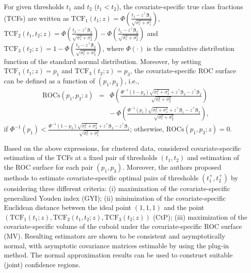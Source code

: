 For given thresholds $t_1$ and $t_2$ ($t_1 < t_2$), the covariate-specific true class fractions (TCFs) are written as $\mathrm{TCF}_1(t_1;z) = \Phi\left(\frac{t_1 - z^\top \boldsymbol{\beta}_1}{\sqrt{\sigma^2_c + \sigma^2_1}}\right)$, $\mathrm{TCF}_2(t_1, t_2;z) = \Phi\left(\frac{t_2 - z^\top \boldsymbol{\beta}_2}{\sqrt{\sigma^2_c + \sigma^2_2}}\right) - \Phi\left(\frac{t_1 - z^\top \boldsymbol{\beta}_2}{\sqrt{\sigma^2_c + \sigma^2_2}}\right)$ and $\mathrm{TCF}_3(t_2;z) = 1 - \Phi\left(\frac{t_2 - z^\top \boldsymbol{\beta}_3}{\sqrt{\sigma^2_c + \sigma^2_3}}\right)$, where $\Phi(\cdot)$ is the cumulative distribution function of the standard normal distribution. Moreover, by setting $\mathrm{TCF}_1(t_1;z) = p_1$ and $\mathrm{TCF}_3(t_2;z) = p_3$, the covariate-specific ROC surface can be defined as a function of $(p_1, p_3)$, i.e., 
\begin{eqnarray}
\mathrm{ROCs}(p_1, p_3; z) &=& \Phi\left(\frac{\Phi^{-1}(1 - p_3)\sqrt{\sigma^2_c + \sigma^2_3} + z^\top \boldsymbol{\beta}_3 - z^\top \boldsymbol{\beta}_2}{\sqrt{\sigma^2_c + \sigma^2_2}}\right) \nonumber \\
&& - \: \Phi\left(\frac{\Phi^{-1}(p_1)\sqrt{\sigma^2_c + \sigma^2_1} + z^\top \boldsymbol{\beta}_1 - z^\top \boldsymbol{\beta}_2}{\sqrt{\sigma^2_c + \sigma^2_2}}\right), \label{eq:rocs}
\end{eqnarray}
if
$\Phi^{-1}(p_1) < \frac{\Phi^{-1}(1 - p_3)\sqrt{\sigma^2_c + \sigma^2_3} + z^\top \boldsymbol{\beta}_3 - z^\top \boldsymbol{\beta}_1}{\sqrt{\sigma^2_c + \sigma^2_1}}$; otherwise, $\mathrm{ROCs}(p_1, p_3; z) = 0$.

Based on the above expressions, for clustered data, \citet{khanh2022} considered covariate-specific estimation of the TCFs at a fixed pair of thresholds $(t_1, t_2)$ and estimation of the ROC surface for each pair $(p_1, p_3)$. Moreover, the authors proposed methods to estimate covariate-specific optimal pairs of thresholds $(t_1^+, t_2^+)$ by considering three different criteria: (i) maximization of the covariate-specific generalized Youden index (GYI); (ii) minimization of the covariate-specific Euclidean distance between the ideal point $(1, 1, 1)$ and the point $\left(\mathrm{TCF}_1(t_1;z), \mathrm{TCF}_2(t_1, t_2;z), \mathrm{TCF}_3(t_2;z)\right)$ (CtP); (iii) maximization of the covariate-specific volume of the cuboid under the covariate-specific ROC surface (MV). Resulting estimators are shown to be consistent and asymptotically normal, with asymptotic covariance matrices estimable by using the plug-in method. The normal approximation results can be used to construct suitable (joint) confidence regions.

